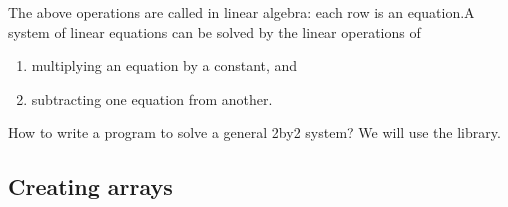 \documentclass[letterpaper,10pt,english]{sphinxmanual}
\begin{document}
The above operations are called  in linear algebra: each row is an equation.A system of linear equations can be solved by the linear operations of
\begin{enumerate}
%
\item {} 
multiplying an equation by a constant, and

\item {} 
subtracting one equation from another.

\end{enumerate}

How to write a program to solve a general 2\sphinxhyphen{}by\sphinxhyphen{}2 system? We will use the  library.


\subsection{Creating  arrays}
\label{\detokenize{Lecture9/Monte Carlo Simulation and Linear Algebra:creating-numpy-arrays}}
\end{document}
